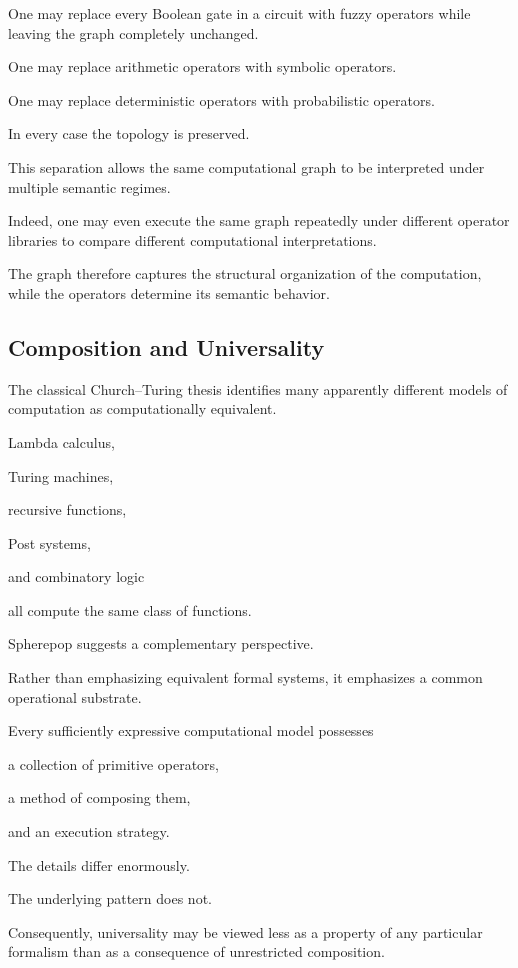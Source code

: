 \documentclass[12pt,oneside]{article}
\begin{document}
One may replace every Boolean gate in a circuit with fuzzy operators while leaving the graph completely unchanged.

One may replace arithmetic operators with symbolic operators.

One may replace deterministic operators with probabilistic operators.

In every case the topology is preserved.

This separation allows the same computational graph to be interpreted under multiple semantic regimes.

Indeed, one may even execute the same graph repeatedly under different operator libraries to compare different computational interpretations.

The graph therefore captures the structural organization of the computation, while the operators determine its semantic behavior.

\subsection{Composition and Universality}

The classical Church--Turing thesis identifies many apparently different models of computation as computationally equivalent.

Lambda calculus,

Turing machines,

recursive functions,

Post systems,

and combinatory logic

all compute the same class of functions.

Spherepop suggests a complementary perspective.

Rather than emphasizing equivalent formal systems, it emphasizes a common operational substrate.

Every sufficiently expressive computational model possesses

a collection of primitive operators,

a method of composing them,

and an execution strategy.

The details differ enormously.

The underlying pattern does not.

Consequently, universality may be viewed less as a property of any particular formalism than as a consequence of unrestricted composition.
\end{document}
